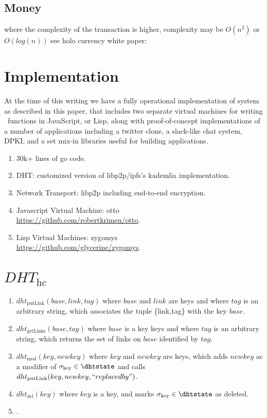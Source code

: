 \documentclass[twocolumn,showpacs,%
  nofootinbib,aps,superscriptaddress,%
  eqsecnum,prd,notitlepage,showkeys,10pt]{revtex4-1}
\begin{document}
\subsection{Money}
where the complexity of the transaction is higher, complexity may be $O(n^2)$ or $O(log(n))$ see holo currency white paper: \cite{holocurrency}


\section{Implementation}
\label{sec:implementation}

At the time of this writing we have a fully operational implementation of system as described in this paper, that includes two separate virtual machines for writing \hcdna\ functions in JavaScript, or Lisp, along with proof-of-concept implementations of a number of applications including a twitter clone, a slack-like chat system, DPKI, and a set mix-in libraries useful for building applications.

\begin{enumerate}
\item 30k+ lines of go code.
\item DHT: customized version of libp2p/ipfs's kademlia implementation.
\item Network Transport: libp2p including end-to-end encryption.
\item Javascript Virtual Machine: otto \\\url{https://github.com/robertkrimen/otto}.
\item Lisp Virtual Machines: zygomys \\\url{https://github.com/glycerine/zygomys}.
\end{enumerate}



\appendix

\section{$DHT_\text{hc}$}
\label{apdx:dhtfn}
\begin{enumerate}

\item $dht_\text{putLink}(base,link,tag)$ where $base$ and $link$ are keys and where $tag$ is an arbitrary string, which associates the tuple \{link,tag\} with the key $base$.
\item $dht_\text{getLinks}(base,tag)$ where $base$ is a key keys and where $tag$ is an arbitrary string, which returns the set of links on $base$ identified by $tag$.
\item $dht_\text{mod}(key,newkey)$ where $key$ and $newkey$ are keys, which adds $newkey$ as a modifier of $\sigma_\text{key} \in \dhtstate$ and calls $dht_\text{putLink}(key,newkey,``replacedby")$.
\item $dht_\text{del}(key)$ where $key$ is a key, and marks $\sigma_\text{key} \in \dhtstate$ as deleted.
\item {}.
\end{enumerate}
\end{document}
